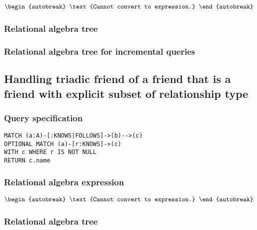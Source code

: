 \begin{align*}
\begin{autobreak}
\text{Cannot convert to expression.}
\end{autobreak}
\end{align*}

\subsubsection*{Relational algebra tree}


\subsubsection*{Relational algebra tree for incremental queries}


\subsection{Handling triadic friend of a friend that is a friend with explicit subset of relationship type}

\subsubsection*{Query specification}

\begin{lstlisting}
MATCH (a:A)-[:KNOWS|FOLLOWS]->(b)-->(c)
OPTIONAL MATCH (a)-[r:KNOWS]->(c)
WITH c WHERE r IS NOT NULL
RETURN c.name
\end{lstlisting}

\subsubsection*{Relational algebra expression}

\begin{align*}
\begin{autobreak}
\text{Cannot convert to expression.}
\end{autobreak}
\end{align*}

\subsubsection*{Relational algebra tree}

